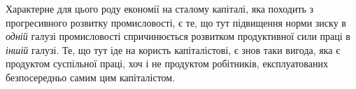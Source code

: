 Характерне для цього роду економії на сталому капіталі,
яка походить з прогресивного розвитку промисловості, є те,
що тут підвищення норми зиску в \emph{одній} галузі промисловості
спричинюється розвитком продуктивної сили праці в \emph{іншій} галузі.
Те, що тут іде на користь капіталістові, є знов таки вигода,
яка є продуктом суспільної праці, хоч і не продуктом робітників,
експлуатованих безпосередньо самим цим капіталістом.
\parbreak{}  %
